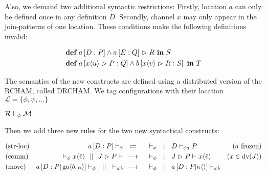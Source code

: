 Also, we demand two additional syntactic restrictions:
Firstly, location $a$ can only be defined once in any definition $D$.
Secondly, channel $x$ may only appear in the join-patterns of one location.
These conditions make the following definitions invalid:

\begin{align*}
  &\jdef
    {\jloc{a}{D}{P} \jcon \jrct{\jloc{a}{E}{Q}}{R}}
    {S}
  \\
  &\jdef
    {\jloc{a}{\jrct{\jrcv{x}{u}}{P}}{Q}
     \jcon
     \jloc{b}{\jrct{\jrcv{x}{v}}{R}}{S}
     }
    {T}
\end{align*}

The semantics of the new constructs are defined using a distributed version
of the RCHAM, called DRCHAM.
We tag configurations with their location
$ \mathcal{L} = \{ \phi, \psi, \ldots \} $

$ \drchamcnf{\phi}{\mathcal{R}}{\mathcal{M}} $


Then we add three new rules for the two new syntactical constructs:

\begin{align*}
  \drchamequ{str-loc}{(a \ \text{frozen)}}{
    \drchamcnf{\phi}{\jloc{a}{D}{P}}{}
  }{
    \drchamcnf{\phi}{}{}
    \drchampar
    \drchamcnf{\phi a}{D}{P}
  }
  \\
  \drchamred{comm}{(x \in \dv{J})}{
    \drchamcnf{\phi}{}{\jsnd{x}{\tilde{v}}}
    \drchampar
    \drchamcnf{}{\jrct{J}{P}}{}
  }{
    \drchamcnf{\phi}{}{}
    \drchampar
    \drchamcnf{}{\jrct{J}{P}}{\jsnd{x}{\tilde{v}}}
  }
  \\
  \drchamred{move}{}{
    \drchamcnf{\phi}{\jloc{a}{D}{P \jpar \jgo{b}{\kappa}}}{}
    \drchampar
    \drchamcnf{\psi b}{}{}
  }{
    \drchamcnf{\phi}{}{}
    \drchampar
    \drchamcnf{\psi b}{\jloc{a}{D}{P \jpar \jsnd{\kappa}{}}}{}
  }
\end{align*}

